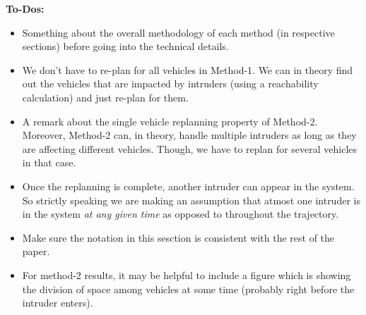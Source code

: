 

\textbf{To-Dos:}
\begin{itemize}
\item Something about the overall methodology of each method (in respective sections) before going into the technical details.\\ 
\item We don't have to re-plan for all vehicles in Method-1. We can in theory find out the vehicles that are impacted by intruders (using a reachability calculation) and just re-plan for them.\\
\item A remark about the single vehicle replanning property of Method-2. Moreover, Method-2 can, in theory, handle multiple intruders as long as they are affecting different vehicles. Though, we have to replan for several vehicles in that case.  \\
\item Once the replanning is complete, another intruder can appear in the system. So strictly speaking we are making an assumption that atmost one intruder is in the system \textit{at any given time} as opposed to throughout the trajectory. \\
\item Make sure the notation in this sesction is consistent with the rest of the paper.\\
\item For method-2 results, it may be helpful to include a figure which is showing the division of space among vehicles at some time (probably right before the intruder enters). 
\end{itemize}
